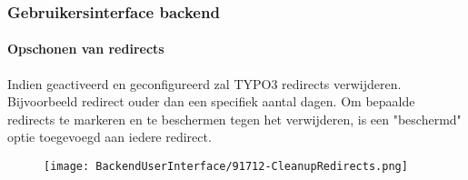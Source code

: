 %

\begin{frame}[fragile]
	\frametitle{Gebruikersinterface backend}
	\framesubtitle{Opschonen van redirects}

	Indien geactiveerd en geconfigureerd zal TYPO3 redirects verwijderen. Bijvoorbeeld
	redirect ouder dan een specifiek aantal dagen.
	Om bepaalde redirects te markeren en te beschermen tegen het verwijderen, is een
	"beschermd" optie toegevoegd aan iedere redirect.

	\begin{figure}
		\texttt{[image: BackendUserInterface/91712-CleanupRedirects.png]}
	\end{figure}

\end{frame}

